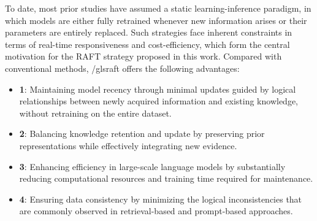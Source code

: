 \documentclass[a4paper,fleqn]{cas-sc}
\begin{document}
To date, most prior studies have assumed a static learning-inference paradigm, in which models are either fully retrained whenever new information arises or their parameters are entirely replaced. Such strategies face inherent constraints in terms of real-time responsiveness and cost-efficiency, which form the central motivation for the RAFT strategy proposed in this work. Compared with conventional methods, /gls{raft} offers the following advantages:
\begin{itemize}
	\item{\textbf{1}:
    Maintaining model recency through minimal updates guided by logical relationships between newly acquired information and existing knowledge, without retraining on the entire dataset.}
	\item{\textbf{2}:
    Balancing knowledge retention and update by preserving prior representations while effectively integrating new evidence.}
	\item{\textbf{3}:
    Enhancing efficiency in large-scale language models by substantially reducing computational resources and training time required for maintenance.}
	\item{\textbf{4}:
    Ensuring data consistency by minimizing the logical inconsistencies that are commonly observed in retrieval-based and prompt-based approaches.}
\end{itemize}
\end{document}
